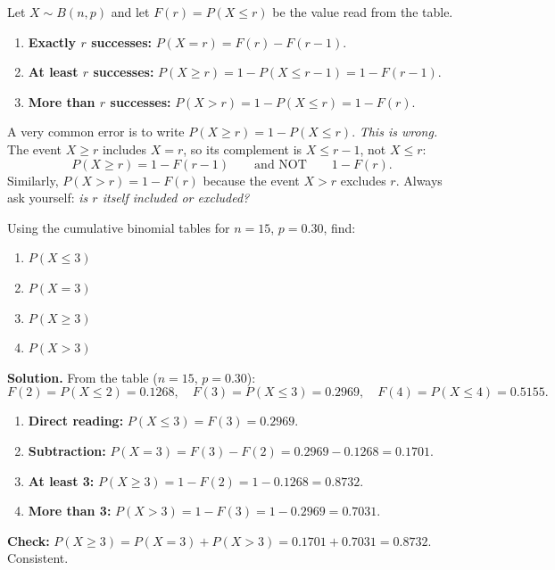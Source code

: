\documentclass[11pt]{article}
\begin{document}
\begin{methode}
Let $X \sim B(n, p)$ and let $F(r) = P(X \le r)$ be the value read from the table.
\begin{enumerate}
    \item \textbf{Exactly $r$ successes:} $P(X = r) = F(r) - F(r-1)$.
    \item \textbf{At least $r$ successes:} $P(X \ge r) = 1 - P(X \le r-1) = 1 - F(r-1)$.
    \item \textbf{More than $r$ successes:} $P(X > r) = 1 - P(X \le r) = 1 - F(r)$.
\end{enumerate}
\end{methode}

\begin{attention}
A very common error is to write $P(X \ge r) = 1 - P(X \le r)$.
\emph{This is wrong.} The event $X \ge r$ includes $X = r$, so its complement is $X \le r-1$, not $X \le r$:
\[
P(X \ge r) = 1 - F(r-1) \qquad \text{and NOT} \qquad 1 - F(r).
\]
Similarly, $P(X > r) = 1 - F(r)$ because the event $X > r$ excludes $r$. Always ask yourself: \emph{is $r$ itself included or excluded?}
\end{attention}

\begin{exoresolu}
Using the cumulative binomial tables for $n=15$, $p=0.30$, find:
\begin{enumerate}
    \item $P(X \le 3)$
    \item $P(X = 3)$
    \item $P(X \ge 3)$
    \item $P(X > 3)$
\end{enumerate}
\tcblower
\textbf{Solution.}
From the table ($n=15$, $p=0.30$):
\[
F(2) = P(X \le 2) = 0.1268, \quad F(3) = P(X \le 3) = 0.2969, \quad F(4) = P(X \le 4) = 0.5155.
\]
\begin{enumerate}
    \item \textbf{Direct reading:} $P(X \le 3) = F(3) = \mathbf{0.2969}$.
    \item \textbf{Subtraction:} $P(X = 3) = F(3) - F(2) = 0.2969 - 0.1268 = \mathbf{0.1701}$.
    \item \textbf{At least 3:} $P(X \ge 3) = 1 - F(2) = 1 - 0.1268 = \mathbf{0.8732}$.
    \item \textbf{More than 3:} $P(X > 3) = 1 - F(3) = 1 - 0.2969 = \mathbf{0.7031}$.
\end{enumerate}
\textbf{Check:} $P(X \ge 3) = P(X=3) + P(X>3) = 0.1701 + 0.7031 = 0.8732$. Consistent.
\end{exoresolu}
\end{document}
